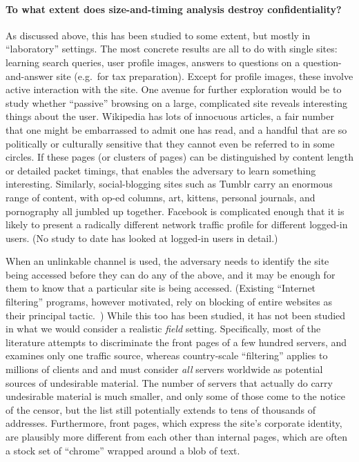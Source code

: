 \documentclass[oneside]{zarticle}
\begin{document}
\begin{multicols}{2}
\paragraph{To what extent does size-and-timing analysis destroy
  confidentiality?}  As discussed above, this has been studied to some
extent, but mostly in “laboratory” settings.  The most concrete
results are all to do with single sites: learning search queries, user
profile images, answers to questions on a question-and-answer site
(e.g.\ for tax preparation).  Except for profile images, these involve
active interaction with the site.  One avenue for further exploration
would be to study whether “passive” browsing on a large, complicated
site reveals interesting things about the user.  Wikipedia has lots of
innocuous articles, a fair number that one might be embarrassed to
admit one has read, and a handful that are so politically or
culturally sensitive that they cannot even be referred to in some
circles.  If these pages (or clusters of pages) can be distinguished
by content length or detailed packet timings, that enables the
adversary to learn something interesting.  Similarly, social-blogging
sites such as Tumblr carry an enormous range of content, with op-ed
columns, art, kittens, personal journals, and pornography all jumbled
up together.  Facebook is complicated enough that it is likely to
present a radically different network traffic profile for different
logged-in users.  (No study to date has looked at logged-in users in
detail.)

When an unlinkable channel is used, the adversary needs to identify
the site being accessed before they can do any of the above, and it
may be enough for them to know that a particular site is being
accessed.  (Existing “Internet filtering” programs, however motivated,
rely on blocking of entire websites as their principal
tactic.~\cite{aase2012whiskey}) While this too has been studied, it
has not been studied in what we would consider a realistic
\emph{field} setting.  Specifically, most of the literature attempts
to discriminate the front pages of a few hundred servers, and examines
only one traffic source, whereas country-scale “filtering” applies to
millions of clients and and must consider \emph{all} servers worldwide as
potential sources of undesirable material.  The number of servers that
actually do carry undesirable material is much smaller, and only some
of those come to the notice of the censor, but the list still
potentially extends to tens of thousands of addresses.  Furthermore,
front pages, which express the site's corporate identity, are
plausibly more different from each other than internal pages, which
are often a stock set of “chrome” wrapped around a blob of text.


\end{multicols}
\end{document}
